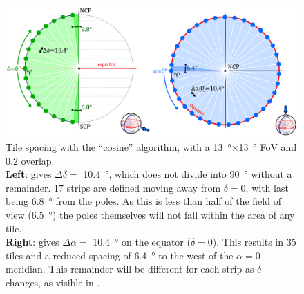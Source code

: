 \begin{colsection}
\begin{colsection}
\begin{figure}[p]
    \begin{center}
        \includegraphics[width=\linewidth]{images/spacing_cosine.pdf}
    \end{center}
    \caption[Tile spacing with the ``cosine'' algorithm]{
        Tile spacing with the ``cosine'' algorithm, with a \SI{13}{\degree}$\times$\SI{13}{\degree} FoV and $0.2$ overlap.
        \\
        \textbf{Left}:  gives $\Delta\delta = $ \SI{10.4}{\degree}, which does not divide into \SI{90}{\degree} without a remainder. 17 strips are defined moving away from $\delta=0$, with last being \SI{6.8}{\degree} from the poles. As this is less than half of the field of view (\SI{6.5}{\degree}) the poles themselves will not fall within the area of any tile.
        \\
        \textbf{Right}:  gives $\Delta\alpha = $ \SI{10.4}{\degree} on the equator ($\delta=0$). This results in 35 tiles and a reduced spacing of \SI{6.4}{\degree} to the west of the $\alpha=0$ meridian. This remainder will be different for each strip as $\delta$ changes, as visible in .
    }\label{fig:cosine_spacing}
\end{figure}


\end{colsection}
\end{colsection}
